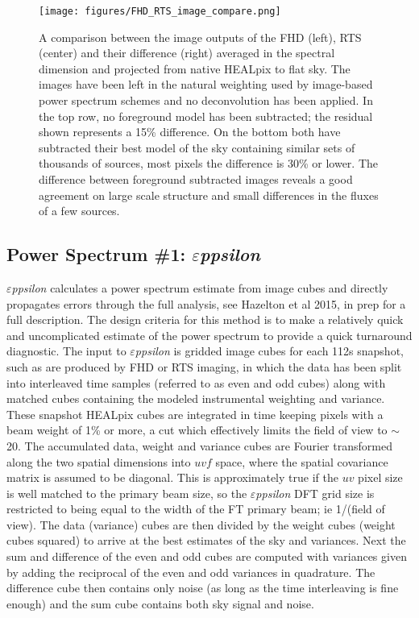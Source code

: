 \documentclass[twolcolumn,iop]{emulateapj}
\def\eppsilon{{\it $\varepsilon$ppsilon}}
\def\eppsiloncite{Hazelton et al 2015, in prep}
\begin{document}
\begin{figure}[htb]
\begin{center}
\texttt{[image: figures/FHD\_RTS\_image\_compare.png]}
\caption{A comparison between the image outputs of the FHD (left), RTS (center) and their difference (right) averaged in the spectral dimension and projected from native HEALpix to flat sky. The images have been left in the natural weighting used by image-based power spectrum schemes and no deconvolution has been applied.   In the top row, no foreground model has been subtracted; the residual shown represents a 15\% difference. On the bottom both have subtracted their best model of the sky containing similar sets of thousands of sources, most pixels the difference is 30\% or lower.   The difference between foreground subtracted images reveals a good agreement on large scale structure and small differences in the fluxes of a few sources.
\label{fig:image_compare}}
\end{center}
\end{figure}


\subsection{Power Spectrum \#1: \eppsilon}
\label{sec:EPPSILON}
\eppsilon{} calculates a power spectrum estimate from image cubes and
directly propagates errors through the full analysis, see \eppsiloncite{} for a full description. The design criteria for this method is to make a relatively quick and uncomplicated estimate of the power spectrum to provide a quick turnaround diagnostic. The input to \eppsilon{} is gridded image cubes for  each 112s snapshot, such as are produced by FHD or RTS imaging, in which the data has been split into interleaved time samples (referred to as even and odd cubes) along with matched cubes containing the modeled instrumental weighting and variance. These snapshot HEALpix cubes are integrated in time keeping pixels with a beam weight of 1\% or more, a cut which effectively limits the field of view to $\sim$20\arcdeg. The accumulated data, weight and variance cubes are Fourier transformed along the two spatial dimensions into $uvf$ space, where the spatial covariance matrix is assumed to be diagonal. This is approximately true if the $uv$ pixel size is well matched to the primary beam size, so the  \eppsilon{} DFT grid size is restricted to being equal to the width of the FT primary beam; ie 1/(field of view). The data (variance) cubes are then divided by the weight cubes (weight cubes squared) to arrive at the best estimates of the sky and variances. Next the sum and difference of the even and odd cubes are computed with variances given by adding the reciprocal of the even and odd variances in quadrature. The difference cube then contains only noise (as long as the time interleaving is fine enough) and the sum cube contains both sky signal and noise.
\end{document}

